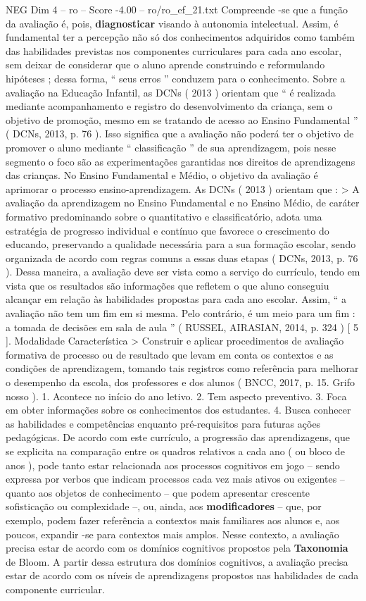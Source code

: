 \begin{textsample}{NEG Dim 4 – ro – Score -4.00 – ro/ro\_ef\_21.txt}
Compreende -se que a função da avaliação é, pois, \textbf{diagnosticar} visando à autonomia intelectual.
Assim, é fundamental ter a percepção não só dos conhecimentos adquiridos como também das habilidades previstas nos componentes curriculares para cada ano escolar, sem deixar de considerar que o aluno aprende construindo e reformulando hipóteses ; dessa forma, “ seus erros ” conduzem para o conhecimento.
Sobre a avaliação na Educação Infantil, as DCNs ( 2013 ) orientam que “ é realizada mediante acompanhamento e registro do desenvolvimento da criança, sem o objetivo de promoção, mesmo em se tratando de acesso ao Ensino Fundamental ” ( DCNs, 2013, p. 76 ).
Isso significa que a avaliação não poderá ter o objetivo de promover o aluno mediante “ classificação ” de sua aprendizagem, pois nesse segmento o foco são as experimentações garantidas nos direitos de aprendizagens das crianças.
No Ensino Fundamental e Médio, o objetivo da avaliação é aprimorar o processo ensino-aprendizagem.
As DCNs ( 2013 ) orientam que : > A avaliação da aprendizagem no Ensino Fundamental e no Ensino Médio, de caráter formativo predominando sobre o quantitativo e classificatório, adota uma estratégia de progresso individual e contínuo que favorece o crescimento do educando, preservando a qualidade necessária para a sua formação escolar, sendo organizada de acordo com regras comuns a essas duas etapas ( DCNs, 2013, p. 76 ).
Dessa maneira, a avaliação deve ser vista como a serviço do currículo, tendo em vista que os resultados são informações que refletem o que aluno conseguiu alcançar em relação às habilidades propostas para cada ano escolar.
Assim, “ a avaliação não tem um fim em si mesma.
Pelo contrário, é um meio para um fim : a tomada de decisões em sala de aula ” ( RUSSEL, AIRASIAN, 2014, p. 324 ) [ 5 ].
Modalidade Característica > Construir e aplicar procedimentos de avaliação formativa de processo ou de resultado que levam em conta os contextos e as condições de aprendizagem, tomando tais registros como referência para melhorar o desempenho da escola, dos professores e dos alunos ( BNCC, 2017, p. 15.
Grifo nosso ). 1.
Acontece no início do ano letivo. 2.
Tem aspecto preventivo. 3.
Foca em obter informações sobre os conhecimentos dos estudantes. 4.
Busca conhecer as habilidades e competências enquanto pré-requisitos para futuras ações pedagógicas.
De acordo com este currículo, a progressão das aprendizagens, que se explicita na comparação entre os quadros relativos a cada ano ( ou bloco de anos ), pode tanto estar relacionada aos processos cognitivos em jogo – sendo expressa por verbos que indicam processos cada vez mais ativos ou exigentes – quanto aos objetos de conhecimento – que podem apresentar crescente sofisticação ou complexidade –, ou, ainda, aos \textbf{modificadores} – que, por exemplo, podem fazer referência a contextos mais familiares aos alunos e, aos poucos, expandir -se para contextos mais amplos.
Nesse contexto, a avaliação precisa estar de acordo com os domínios cognitivos propostos pela \textbf{Taxonomia} de Bloom.
A partir dessa estrutura dos domínios cognitivos, a avaliação precisa estar de acordo com os níveis de aprendizagens propostos nas habilidades de cada componente curricular.

\end{textsample}
